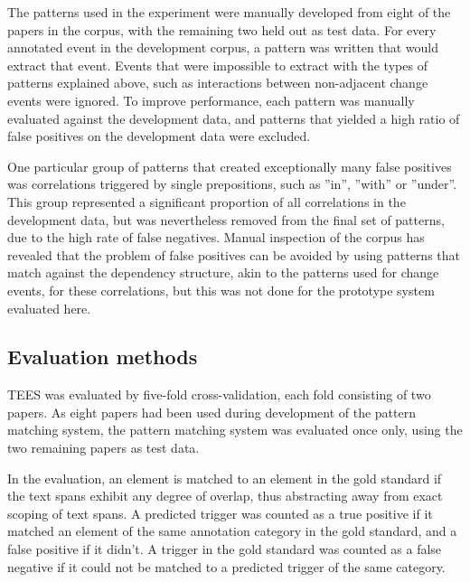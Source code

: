 The patterns used in the experiment were manually developed from eight of the papers in the corpus, with the remaining two held out as test data. For every annotated event in the development corpus, a pattern was written that would extract that event. Events that were impossible to extract with the types of patterns explained above, such as interactions between non-adjacent change events were ignored. To improve performance, each pattern was manually evaluated against the development data, and patterns that yielded a high ratio of false positives on the development data were excluded. 

One particular group of patterns that created exceptionally many false positives was correlations triggered by single prepositions, such as ''in'', ''with'' or ''under''. This group represented a significant proportion of all correlations in the development data, but was nevertheless removed from the final set of patterns, due to the high rate of false negatives. Manual inspection of the corpus has revealed that the problem of false positives can be avoided by using patterns that match against the dependency structure, akin to the patterns used for change events, for these correlations, but this was not done for the prototype system evaluated here.

\subsection{Evaluation methods}

TEES was evaluated by five-fold cross-validation, each fold consisting of two papers. As eight papers had been used during development of the pattern matching system, the pattern matching system was evaluated once only, using the two remaining papers as test data.

In the evaluation, an element is matched to an element in the gold standard if the text spans exhibit any degree of overlap, thus abstracting away from exact scoping of text spans. A predicted trigger was counted as a true positive if it matched an element of the same annotation category in the gold standard, and a false positive if it didn't. A trigger in the gold standard was counted as a false negative if it could not be matched to a predicted trigger of the same category. 